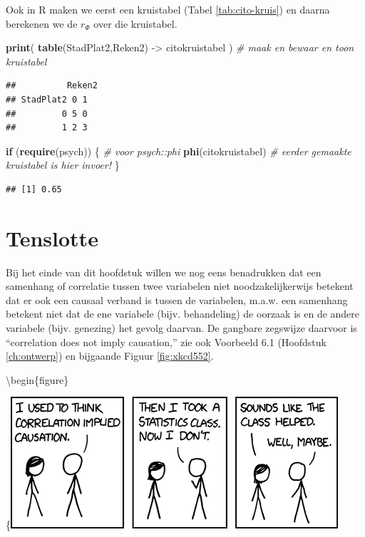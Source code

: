 \documentclass[
]{book}
\newenvironment{Shaded}{\begin{snugshade}}{\end{snugshade}}
\newcommand{\CommentTok}[1]{\textcolor[rgb]{0.56,0.35,0.01}{\textit{#1}}}
\newcommand{\ControlFlowTok}[1]{\textcolor[rgb]{0.13,0.29,0.53}{\textbf{#1}}}
\newcommand{\KeywordTok}[1]{\textcolor[rgb]{0.13,0.29,0.53}{\textbf{#1}}}
\newcommand{\NormalTok}[1]{#1}
\newcommand{\StringTok}[1]{\textcolor[rgb]{0.31,0.60,0.02}{#1}}
\begin{document}
Ook in R maken we eerst een kruistabel (Tabel \ref{tab:cito-kruis}) en daarna berekenen we de \(r_\Phi\) over die kruistabel.

\begin{Shaded}
\begin{Highlighting}[]
\KeywordTok{print}\NormalTok{( }\KeywordTok{table}\NormalTok{(StadPlat2,Reken2) {-}\textgreater{}}\StringTok{ }\NormalTok{citokruistabel ) }\CommentTok{\# maak en bewaar en toon kruistabel}
\end{Highlighting}
\end{Shaded}

\begin{verbatim}
##          Reken2
## StadPlat2 0 1
##         0 5 0
##         1 2 3
\end{verbatim}

\begin{Shaded}
\begin{Highlighting}[]
\ControlFlowTok{if}\NormalTok{ (}\KeywordTok{require}\NormalTok{(psych)) \{ }\CommentTok{\# voor psych::phi}
  \KeywordTok{phi}\NormalTok{(citokruistabel) }\CommentTok{\# eerder gemaakte kruistabel is hier invoer!}
\NormalTok{\}}
\end{Highlighting}
\end{Shaded}

\begin{verbatim}
## [1] 0.65
\end{verbatim}

\hypertarget{sec:correlationcausation}{%
\section{Tenslotte}\label{sec:correlationcausation}}

Bij het einde van dit hoofdstuk willen we nog eens benadrukken dat een
samenhang of correlatie tussen twee variabelen niet noodzakelijkerwijs
betekent dat er ook een causaal verband is tussen de variabelen, m.a.w.
een samenhang betekent niet dat de ene variabele (bijv. behandeling) de
oorzaak is en de andere variabele (bijv. genezing) het gevolg daarvan.
De gangbare zegswijze daarvoor is ``correlation does not imply
causation,'' zie ook Voorbeeld 6.1 (Hoofdstuk \ref{ch:ontwerp})
en bijgaande Figuur \ref{fig:xkcd552}.

\textbackslash begin\{figure\}

\{\centering \includegraphics{figures/correlation}
\end{document}
